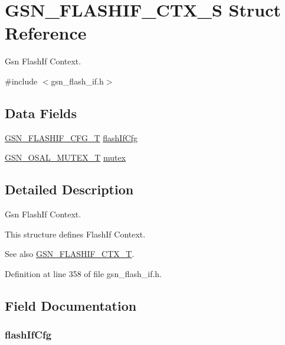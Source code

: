 \hypertarget{a00079}{
\section{GSN\_\-FLASHIF\_\-CTX\_\-S Struct Reference}
\label{a00079}
}


Gsn FlashIf Context.  




{\ttfamily \#include $<$gsn\_\-flash\_\-if.h$>$}

\subsection*{Data Fields}
\begin{DoxyCompactItemize}
\item 
\hyperlink{a00078}{GSN\_\-FLASHIF\_\-CFG\_\-T} \hyperlink{a00079_ab58f2afb00bb6804eef213b944f73ad6}{flashIfCfg}
\item 
\hyperlink{a00628_gae997291afc7166c897f459023e0154ad}{GSN\_\-OSAL\_\-MUTEX\_\-T} \hyperlink{a00079_a8586d6383a0c3353fb572f07d6ef7d87}{mutex}
\end{DoxyCompactItemize}


\subsection{Detailed Description}
Gsn FlashIf Context. 

This structure defines FlashIf Context.

\begin{DoxySeeAlso}{See also}
\hyperlink{a00647_gacef88670392e2c2c8f6cc45eab1ad658}{GSN\_\-FLASHIF\_\-CTX\_\-T}. 
\end{DoxySeeAlso}


Definition at line 358 of file gsn\_\-flash\_\-if.h.



\subsection{Field Documentation}
\hypertarget{a00079_ab58f2afb00bb6804eef213b944f73ad6}{
\subsubsection[{flashIfCfg}]{ {\bf flashIfCfg}}}
\label{a00079_ab58f2afb00bb6804eef213b944f73ad6}



